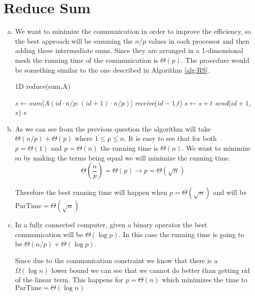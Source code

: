 \documentclass[a4paper]{article}
\begin{document}
\section{Reduce Sum}
    \begin{enumerate}[a)]
    \item We want to minimize the communication in order to improve the efficiency, so the best approach will be summing the $n/p$ values in each processor and then adding these intermediate sums. Since they are arranged in a 1-dimensional mesh the running time of the communication is $\Theta(p)$. The procedure would be something similar to the one described in Algorithm \ref{alg:RS}.
    \begin{algorithm}
        \caption{1D reduce(sum,A)}\label{alg:RS}
        \begin{algorithmic}[1]
            \Statex
                \State $s \gets sum[ A(id \cdot n/p:(id+1) \cdot n/p) $]
                    \State \emph{receive}($id-1$,$t$)
                    \State $s \gets s + t$
                \EndIf
                    \State \emph{send}($id+1$,$s$)
                \EndIf
                \State \Return $s$
            \EndProcedure
        \end{algorithmic}
    \end{algorithm}

    \item As we can see from the previous question the algorithm will take $\Theta(n/p) + \Theta(p)$ where $1 \leq p\leq n$. It is easy to see that for both $p = \Theta(1)$ and $p = \Theta(n)$ the running time is $\Theta(n)$. We want to minimize so by making the terms being equal we will minimize the running time.
    \begin{equation}
        \Theta \left( \frac{n}{p} \right) = \Theta(p) \rightarrow p = \Theta(\sqrt{n})
    \end{equation}

    Therefore the best running time will happen when $p = \Theta(\sqrt{n})$ and will be $\text{ParTime} = \Theta(\sqrt{n})$

    
    \item In a fully connected computer, given a binary operator the best communication will be $\Theta(\log p)$. In this case the running time is going to be $\Theta(n/p) + \Theta(\log p)$.

    Since due to the communication constraint we know that there is a $\Omega(\log n)$ lower bound we can see that we cannot do better than getting rid of the linear term. This happens for $p = \Theta(n)$ which minimizes the time to $\text{ParTime} = \Theta(\log n)$
    
    \end{enumerate}
\end{document}
